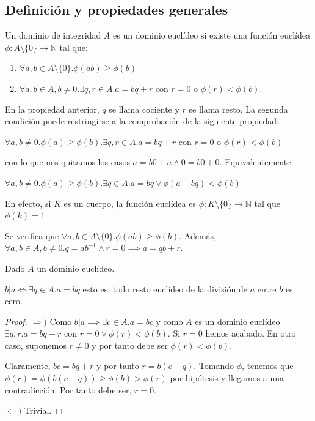 \subsection{Definición y propiedades generales}

\begin{definition}
	Un dominio de integridad $A$ es un dominio euclídeo si existe una función euclídea $\phi:A \setminus \{0\} \to \mathbb{N}$ tal que:
	
	\begin{enumerate}
	\item $\forall a,b \in A \setminus \{0\}. \phi(ab) \ge \phi(b)$
	\item $\forall a,b \in A,b \neq 0. \exists q,r \in A. a = bq + r$ con $r = 0$ o $\phi(r) < \phi(b)$.
	\end{enumerate}
	
	En la propiedad anterior, $q$ se llama cociente y $r$ se llama resto. La segunda condición puede restringirse a la comprobación de la siguiente propiedad: 
	
	$\forall a,b \neq 0. \phi(a) \ge \phi(b). \exists q,r \in A. a = bq + r$ con $r = 0$ o $\phi(r) < \phi(b)$
	
	con lo que nos quitamos los casos $a = b0 + a \land 0 = b0 + 0$. Equivalentemente:
	
	$\forall a,b \neq 0. \phi(a) \ge \phi(b). \exists q \in A. a = bq \lor \phi(a-bq) < \phi(b)$
\end{definition}

\begin{example}

En efecto, si $K$ es un cuerpo, la función euclídea es $\phi: K \setminus \{0\} \to \mathbb{N}$ tal que $\phi(k) = 1$. 

Se verifica que $\forall a,b \in A \setminus \{0\}.\phi(ab) \ge \phi(b)$. Además, $\forall a,b \in A, b \neq 0. q = a b^{-1} \land r = 0 \implies a = qb + r$.
\end{example}

\begin{proposition}
	Dado $A$ un dominio euclídeo. 
	
	$b | a \iff \exists q \in A. a = bq$ esto es, todo resto euclídeo de la división de $a$ entre $b$ es cero. 
\end{proposition}
\begin{proof}
	$\Rightarrow)$ Como $b|a \implies \exists c \in A. a = bc$ y como $A$ es un dominio euclídeo $\exists q,r. a = bq + r$ con $r = 0 \lor \phi(r) < \phi(b)$. Si $r = 0$ hemos acabado. En otro caso, suponemos $r \neq 0$ y por tanto debe ser $\phi(r) < \phi(b)$. 
	
	Claramente, $bc = bq + r $ y por tanto $r = b(c-q)$. Tomando $\phi$, tenemos que $\phi(r) = \phi(b(c-q)) \ge \phi(b) > \phi(r)$ por hipótesis y llegamos a una contradicción. Por tanto debe ser, $r = 0$. 
	
	$\Leftarrow)$ Trivial. 
\end{proof}

